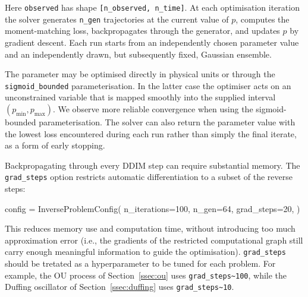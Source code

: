 Here \texttt{observed} has shape \texttt{[n\_observed, n\_time]}. At each optimisation iteration the solver generates \texttt{n\_gen} trajectories at the current value of $p$, computes the moment-matching loss, backpropagates through the generator, and updates $p$ by gradient descent. Each run starts from an independently chosen parameter value and an independently drawn, but subsequently fixed, Gaussian ensemble.

The parameter may be optimised directly in physical units or through the \texttt{sigmoid\_bounded} parameterisation. In the latter case the optimiser acts on an unconstrained variable that is mapped smoothly into the supplied interval $(p_{\min},p_{\max})$. We observe more reliable convergence when using the sigmoid-bounded parameterisation. The solver can also return the parameter value with the lowest loss encountered during each run rather than simply the final iterate, as a form of early stopping.

Backpropagating through every DDIM step can require substantial memory. The \texttt{grad\_steps} option restricts automatic differentiation to a subset of the reverse steps:
\begin{pythonlisting}
config = InverseProblemConfig(
    n_iterations=100,
    n_gen=64,
    grad_steps=20,
)
\end{pythonlisting}
This reduces memory use and computation time, without introducing too much approximation error (i.e., the gradients of the restricted computational graph still carry enough meaningful information to guide the optimisation). \texttt{grad\_steps} should be tretated as a hyperparameter to be tuned for each problem. For example, the OU process of Section~\ref{ssec:ou} uses \texttt{grad\_steps\sim100}, while the Duffing oscillator of Section~\ref{ssec:duffing} uses \texttt{grad\_steps\sim10}.